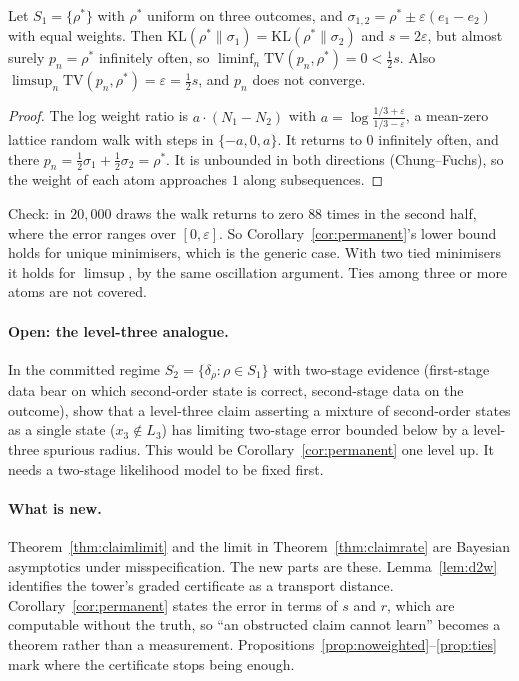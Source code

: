 \begin{proposition}\label{prop:ties}
Let $S_1=\{\rho^*\}$ with $\rho^*$ uniform on three outcomes, and $\sigma_{1,2}=\rho^*\pm\varepsilon(e_1-e_2)$ with equal weights. Then $\mathrm{KL}(\rho^*\|\sigma_1)=\mathrm{KL}(\rho^*\|\sigma_2)$ and $s=2\varepsilon$, but almost surely $p_n=\rho^*$ infinitely often, so $\liminf_n\mathrm{TV}(p_n,\rho^*)=0<\frac12 s$. Also $\limsup_n\mathrm{TV}(p_n,\rho^*)=\varepsilon=\frac12 s$, and $p_n$ does not converge.
\end{proposition}
\begin{proof}
The log weight ratio is $a\cdot(N_1-N_2)$ with $a=\log\frac{1/3+\varepsilon}{1/3-\varepsilon}$, a mean-zero lattice random walk with steps in $\{-a,0,a\}$. It returns to $0$ infinitely often, and there $p_n=\frac12\sigma_1+\frac12\sigma_2=\rho^*$. It is unbounded in both directions (Chung--Fuchs), so the weight of each atom approaches $1$ along subsequences.
\end{proof}
Check: in $20{,}000$ draws the walk returns to zero $88$ times in the second half, where the error ranges over $[0,\varepsilon]$. So Corollary~\ref{cor:permanent}'s lower bound holds for unique minimisers, which is the generic case. With two tied minimisers it holds for $\limsup$, by the same oscillation argument. Ties among three or more atoms are not covered.

\paragraph{Open: the level-three analogue.} In the committed regime $S_2=\{\delta_\rho:\rho\in S_1\}$ with two-stage evidence (first-stage data bear on which second-order state is correct, second-stage data on the outcome), show that a level-three claim asserting a mixture of second-order states as a single state ($x_3\notin L_3$) has limiting two-stage error bounded below by a level-three spurious radius. This would be Corollary~\ref{cor:permanent} one level up. It needs a two-stage likelihood model to be fixed first.

\paragraph{What is new.} Theorem~\ref{thm:claimlimit} and the limit in Theorem~\ref{thm:claimrate} are Bayesian asymptotics under misspecification. The new parts are these. Lemma~\ref{lem:d2w} identifies the tower's graded certificate as a transport distance. Corollary~\ref{cor:permanent} states the error in terms of $s$ and $r$, which are computable without the truth, so ``an obstructed claim cannot learn'' becomes a theorem rather than a measurement. Propositions~\ref{prop:noweighted}--\ref{prop:ties} mark where the certificate stops being enough.

